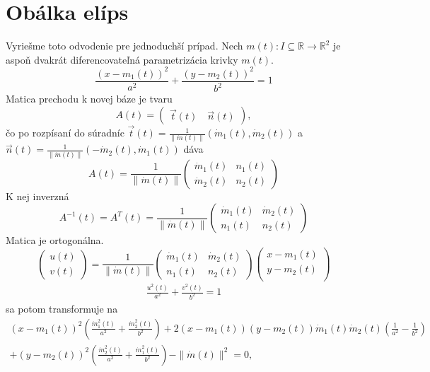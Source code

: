 \section{Obálka elíps}
Vyriešme toto odvodenie pre jednoduchší prípad. Nech $m(t) \colon  I \subseteq \mathbb{R} \rightarrow \mathbb{R}^2$ je aspoň dvakrát diferencovateľná parametrizácia krivky $m(t).$
\begin{equation}
\frac{{(x - m_1(t))^2}}{{a^2}} + \frac{{(y - m_2(t))^2}}{{b^2}} = 1
\end{equation}
Matica prechodu k novej báze je tvaru
$$
A(t) = \left(\begin{matrix} \vec{t}(t) \quad \vec{n}(t)
\end{matrix} \right),
$$
čo po rozpísaní do súradníc $\vec{t}(t) = \frac{1}{ \| \dot{m}(t) \|}( \dot{m}_1(t),  \dot{m}_2(t))$ a $\vec{n}(t) = \frac{1}{ \| \dot{m}(t) \|}( -\dot{m}_2(t),  \dot{m}_1(t))$ dáva 
$$
A(t) = \frac{1}{ \| \dot{m}(t) \|} \left(\begin{matrix}
   \dot{m}_1(t) & n_1(t) \\
   \dot{m}_2(t) & n_2(t)
\end{matrix} \right)
$$
K nej inverzná 
$$
A^{-1}(t) = A^{T}(t) = \frac{1}{ \| \dot{m}(t) \|} \left(\begin{matrix}
  \dot{m}_1(t) & \dot{m}_2(t) \\
    n_1(t) & n_2(t)
\end{matrix}\right)
$$
Matica je ortogonálna.
$$
\left(\begin{matrix}
u(t) \\
v(t)
\end{matrix}\right) = \frac{1}{ \| \dot{m}(t) \|}
\left(\begin{matrix}
  \dot{m}_1(t) & \dot{m}_2(t) \\
    n_1(t) & n_2(t)
\end{matrix}\right)
\left(\begin{matrix}
x-m_1(t) \\
y-m_2(t) \\
\end{matrix}\right)
$$
\begin{align*}
\frac{u^2(t)}{a^2} + \frac{v^2(t)}{b^2} = 1
\end{align*}
sa potom transformuje na 
\begin{align*}
(x-m_1(t))^2(\frac{\dot{m}_1^2(t)}{a^2} + \frac{\dot{m}_2^2(t)}{b^2}) + 2(x-m_1(t))(y-m_2(t))\dot{m}_1(t)\dot{m}_2(t)(\frac{1}{a^2}-\frac{1}{b^2}) \\ 
+ (y-m_2(t))^2(\frac{\dot{m}_2^2(t)}{a^2} + \frac{\dot{m}_1^2(t)}{b^2}) - \| \dot{m}(t) \|^2 = 0,
\end{align*}
